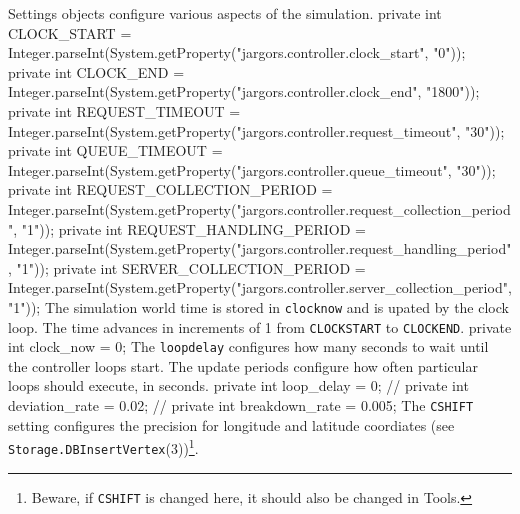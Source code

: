  Settings objects configure various aspects of the simulation.
\nwenddocs{}\endmoddef{}
private int CLOCK_START =
    Integer.parseInt(System.getProperty("jargors.controller.clock_start", "0"));
private int CLOCK_END =
    Integer.parseInt(System.getProperty("jargors.controller.clock_end", "1800"));
private int REQUEST_TIMEOUT =
    Integer.parseInt(System.getProperty("jargors.controller.request_timeout", "30"));
private int QUEUE_TIMEOUT =
    Integer.parseInt(System.getProperty("jargors.controller.queue_timeout", "30"));
private int REQUEST_COLLECTION_PERIOD =
    Integer.parseInt(System.getProperty("jargors.controller.request_collection_period", "1"));
private int REQUEST_HANDLING_PERIOD =
    Integer.parseInt(System.getProperty("jargors.controller.request_handling_period", "1"));
private int SERVER_COLLECTION_PERIOD =
    Integer.parseInt(System.getProperty("jargors.controller.server_collection_period", "1"));
\nwendcode{}\nwdocspar
The simulation world time is stored in {\tt{}clock{}now} and is upated by the
clock loop. The time advances in increments of 1 from {\tt{}CLOCK{}START}
to {\tt{}CLOCK{}END}.
\nwenddocs{}\plusendmoddef
private int clock_now = 0;
\nwendcode{}\nwdocspar
The {\tt{}loop{}delay} configures how many seconds to wait until the controller
loops start. The update periods configure how often particular loops should
execute, in seconds.
\nwenddocs{}\plusendmoddef
private int loop_delay = 0;
// private int deviation_rate = 0.02;
// private int breakdown_rate = 0.005;
\nwendcode{}\nwdocspar
The {\tt{}CSHIFT} setting configures the precision for longitude and latitude
coordiates (see {\tt{}Storage.\protect{}DBInsertVertex}(3))\footnote{Beware, if {\tt{}CSHIFT}
is changed here, it should also be changed in Tools.}.
